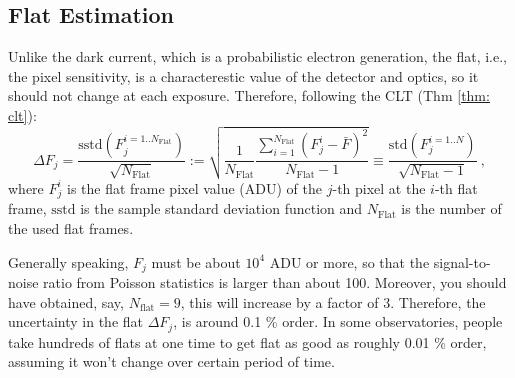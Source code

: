 \subsection{Flat Estimation}
Unlike the dark current, which is a probabilistic electron generation, the flat, i.e., the pixel sensitivity, is a characterestic value of the detector and optics, so it should not change at each exposure. Therefore, following the CLT (Thm \ref{thm: clt}): 
\begin{equation}
  \Delta F_j 
    = \frac{\mathrm{sstd} (F_j^{i=1..N_\mathrm{Flat}})} {\sqrt{N_\mathrm{Flat}}}
    := \sqrt{ \frac{1}{N_\mathrm{Flat}}
       \frac{\sum_{i=1}^{N_\mathrm{Flat}} (F_j^{i} - \bar{F})^2}{N_\mathrm{Flat} - 1}} 
       \equiv \frac{\mathrm{std}(F_j^{i=1..N})}{\sqrt{N_\mathrm{Flat} - 1}} ~,
\end{equation}
where $ F_j^{i} $ is the flat frame pixel value (ADU) of the $ j $-th pixel at the $ i $-th flat frame, $ \mathrm{sstd} $ is the sample standard deviation function and $ N_\mathrm{Flat} $ is the number of the used flat frames. 

Generally speaking, $ F_j $ must be about $ 10^4 $ ADU or more, so that the signal-to-noise ratio from Poisson statistics is larger than about 100. Moreover, you should have obtained, say, $ N_\mathrm{flat} = 9 $, this will increase by a factor of 3. Therefore, the uncertainty in the flat $ \Delta F_j $, is around 0.1 \% order. In some observatories, people take hundreds of flats at one time to get flat as good as roughly 0.01 \% order, assuming it won't change over certain period of time.

